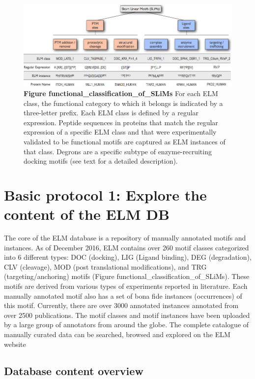 \begin{figure}[h!]
\centering
\includegraphics[width=\textwidth]{Figures/functional_classification_of_SLiMs.png}
\caption{
\textbf{Figure functional\_classification\_of\_SLiMs} For each ELM
class, the functional category to which it belongs is indicated by a
three-letter prefix. Each ELM class is defined by a regular expression.
Peptide sequences in proteins that match the regular expression of a
specific ELM class and that were experimentally validated to be
functional motifs are captured as ELM instances of that class. Degrons
are a specific subtype of enzyme-recruiting docking motifs (see text for
a detailed description).
}
\end{figure}

\section{Basic protocol 1: Explore the content of the ELM
DB}\label{basic-protocol-1-explore-the-content-of-the-elm-db}

The core of the ELM database is a repository of manually annotated
motifs and instances. As of December 2016, ELM contains over 260 motif
classes categorized into 6 different types: DOC (docking), LIG (Ligand
binding), DEG (degradation), CLV (cleavage), MOD (post translational
modifications), and TRG (targeting/anchoring) motifs (Figure
functional\_classification\_of\_SLiMs). These motifs are derived from
various types of experiments reported in literature. Each manually
annotated motif also has a set of bona fide instances (occurrences) of
this motif. Currently, there are over 3000 annotated instances annotated
from over 2500 publications. The motif classes and motif instances have
been uploaded by a large group of annotators from around the globe. The
complete catalogue of manually curated data can be searched, browsed and
explored on the ELM website

\subsection{Database content overview}\label{database-content-overview}

